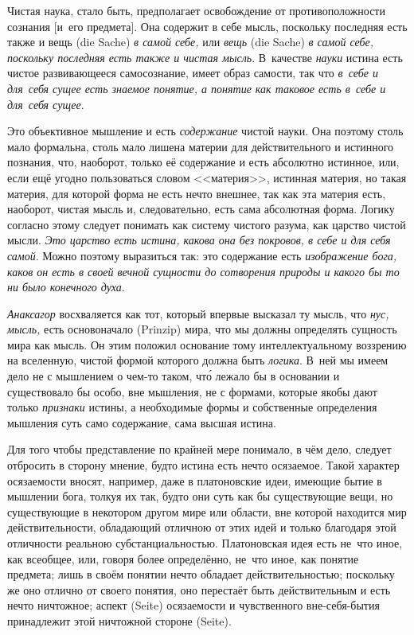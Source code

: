 Чистая наука, стало быть, предполагает освобождение от противоположности
сознания [и~его предмета]. Она содержит в себе мысль, поскольку последняя
есть также и вещь (die Sache) {\em в самой себе,} или
{\em вещь} (die Sache) {\em в самой себе, поскольку последняя есть также
и чистая мысль}. В~качестве {\em науки} истина есть чистое развивающееся
самосознание, имеет образ самости, так что {\em в~себе и для~себя сущее
есть знаемое понятие, а понятие как таковое есть в~себе и для~себя сущее}.

Это объективное мышление и есть {\em содержание} чистой
науки. Она поэтому столь мало формальна, столь мало лишена материи для
действительного и истинного познания, что, наоборот, только её содержание и
есть абсолютно истинное, или, если ещё угодно пользоваться словом
<<материя>>, истинная материя, но такая материя, для которой форма не есть
нечто внешнее, так как эта материя есть, наоборот, чистая мысль и,
следовательно, есть сама абсолютная форма. Логику согласно этому следует
понимать как систему чистого разума, как царство чистой мысли.
{\em Это царство есть истина, какова она без покровов,
в себе и для себя самой}. Можно поэтому выразиться так: это содержание есть
{\em изображение бога, каков он есть в своей вечной
сущности до сотворения природы и какого бы то ни было конечного духа}.

{\em Анаксагор} восхваляется как тот, который впервые
высказал ту мысль, что {\em нус,}
{\em мысль,} есть основоначало (Prinzip) мира, что мы
должны определять сущность мира как мысль. Он этим положил основание тому
интеллектуальному воззрению на вселенную, чистой формой которого должна
быть {\em логика}. В~ней мы имеем дело не с мышлением о
чем-то таком, чт\'{о} лежало бы в основании и существовало бы особо, вне
мышления, не с формами, которые якобы дают только
{\em признаки} истины, а необходимые формы и
собственные определения мышления суть само содержание, сама высшая истина.

Для того чтобы представление по крайней мере понимало, в чём дело, следует
отбросить в сторону мнение, будто истина есть нечто осязаемое. Такой
характер осязаемости вносят, например, даже в платоновские идеи, имеющие
бытие в мышлении бога, толкуя их так, будто они суть как бы существующие
вещи, но существующие в некотором другом мире или области, вне которой
находится мир действительности, обладающий отличною от этих идей и только
благодаря этой отличности реальною субстанциальностью. Платоновская идея
есть не~что иное, как всеобщее, или, говоря более определённо, не~что иное,
как понятие предмета; лишь в своём понятии нечто обладает
действительностью; поскольку же оно отлично от своего понятия, оно
перестаёт быть действительным и есть нечто ничтожное; аспект (Seite)
осязаемости и чувственного вне-себя-бытия принадлежит этой ничтожной
стороне (Seite).

